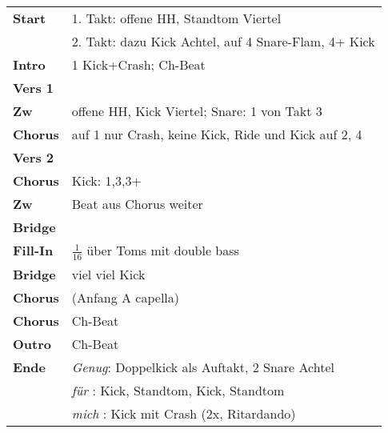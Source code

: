
\begin{tabular}{p{1.6cm}l}
	\textbf{Start}   & 1. Takt: offene HH, Standtom Viertel                   \\
	                 & 2. Takt: dazu Kick Achtel, auf 4 Snare-Flam, 4+ Kick   \\
	\textbf{Intro}   & 1 Kick+Crash; Ch-Beat                                  \\
	\textbf{Vers 1}  &                                                        \\
	\textbf{Zw}      & offene HH, Kick Viertel; Snare: 1 von Takt 3           \\
	\textbf{Chorus}  & auf 1 nur Crash, keine Kick, Ride und Kick auf 2, 4    \\
	\textbf{Vers 2}  &                                                        \\
	\textbf{Chorus}  & Kick: 1,3,3+                                           \\
	\textbf{Zw}      & Beat aus Chorus weiter                                 \\
	\textbf{Bridge}  &                                                        \\
	\textbf{Fill-In} & $\frac{1}{16}$ über Toms mit double bass               \\
	\textbf{Bridge}  & viel viel Kick                                         \\
	\textbf{Chorus}  & (Anfang A capella)                                     \\
	\textbf{Chorus}  & Ch-Beat                                                \\
	\textbf{Outro}   & Ch-Beat                                                \\
	\textbf{Ende}    & \textit{Genug}: Doppelkick als Auftakt, 2 Snare Achtel \\
	                 & \textit{für  }: Kick, Standtom, Kick, Standtom         \\
	                 & \textit{mich }: Kick mit Crash (2x, Ritardando)        \\
\end{tabular}
